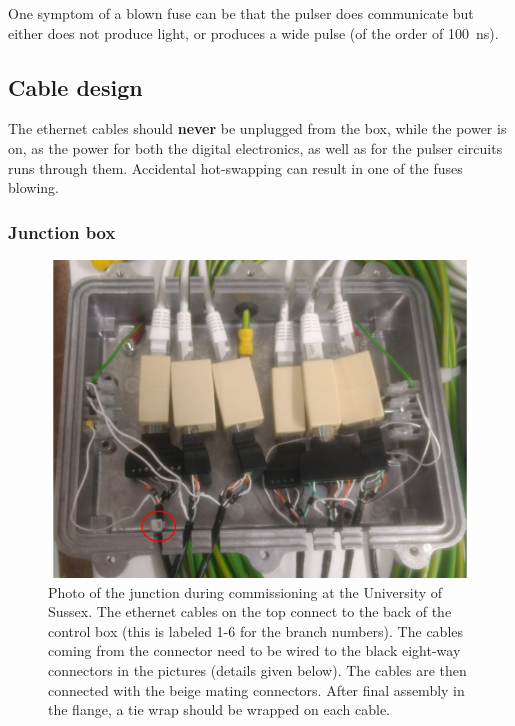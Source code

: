 One symptom of a blown fuse can be that  the pulser does communicate but either does not produce light, or produces a wide pulse (of the order of 100~ns).


\subsection*{Cable design}


The ethernet cables should {\bf never} be unplugged from the box, while the power is on, as the power for both the digital electronics, as well as for the pulser circuits runs through them. Accidental hot-swapping can result in one of the fuses blowing. 

\subsubsection*{Junction box}


\begin{figure}
\begin{center}	
  \includegraphics[width=0.75\linewidth]{figures/junction_box.jpg}
  \caption{Photo of the junction during commissioning at the University of Sussex. The ethernet cables on the top connect to the back of the control box (this is labeled 1-6 for the branch numbers). The cables coming from the connector need to be wired to the black eight-way connectors in the pictures (details given below). The cables are then connected with the beige mating connectors. After final assembly in the flange, a tie wrap should be wrapped on each cable. }
  \label{figure:junction_box}
\end{center}
\end{figure}



